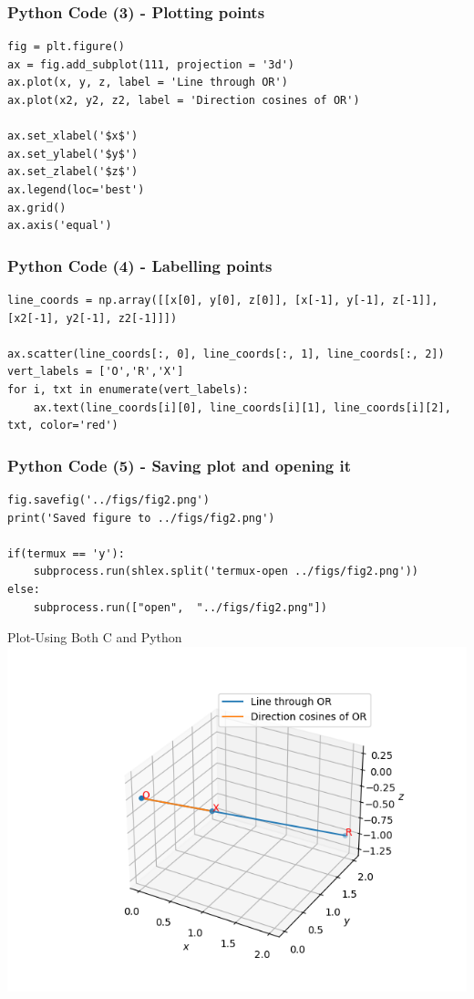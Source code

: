 \documentclass{beamer}
\begin{document}
\begin{frame}[fragile]
    \frametitle{Python Code (3) - Plotting points}
    \begin{lstlisting}
fig = plt.figure()
ax = fig.add_subplot(111, projection = '3d')
ax.plot(x, y, z, label = 'Line through OR')
ax.plot(x2, y2, z2, label = 'Direction cosines of OR')

ax.set_xlabel('$x$')
ax.set_ylabel('$y$')
ax.set_zlabel('$z$')
ax.legend(loc='best')
ax.grid() 
ax.axis('equal')
\end{lstlisting}
\end{frame}

\begin{frame}[fragile]
    \frametitle{Python Code (4) - Labelling points}
    \begin{lstlisting}
line_coords = np.array([[x[0], y[0], z[0]], [x[-1], y[-1], z[-1]], [x2[-1], y2[-1], z2[-1]]])

ax.scatter(line_coords[:, 0], line_coords[:, 1], line_coords[:, 2])
vert_labels = ['O','R','X']
for i, txt in enumerate(vert_labels):
    ax.text(line_coords[i][0], line_coords[i][1], line_coords[i][2], txt, color='red')
\end{lstlisting}    
\end{frame}

\begin{frame}[fragile]
    \frametitle{Python Code (5) - Saving plot and opening it}
    \begin{lstlisting}
fig.savefig('../figs/fig2.png')
print('Saved figure to ../figs/fig2.png')

if(termux == 'y'):
    subprocess.run(shlex.split('termux-open ../figs/fig2.png'))
else:
    subprocess.run(["open",  "../figs/fig2.png"])
\end{lstlisting}
\end{frame}

\begin{frame}{Plot-Using Both C and Python}
    \centering
    \includegraphics[width=\columnwidth, height=0.8\textheight, keepaspectratio]{../figs/fig2.png}     
\end{frame}
\end{document}
